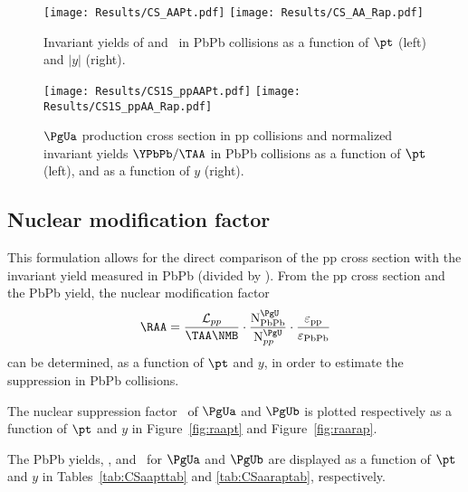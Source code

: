 \begin{figure}[ht]
\begin{centering}  
  \texttt{[image: Results/CS\_AAPt.pdf]}
  \texttt{[image: Results/CS\_AA\_Rap.pdf]}
  \caption{Invariant yields of \PgUa and \PgUb\ in PbPb collisions as
    a function of $\pt$ (left) and $|y|$ (right).}
  \label{fig:CSaapt1vs2} 
\end{centering}  
\end{figure}


\begin{figure}[thp]
\begin{centering}  
  \texttt{[image: Results/CS1S\_ppAAPt.pdf]}
  \texttt{[image: Results/CS1S\_ppAA\_Rap.pdf]}
 \caption{$\PgUa$ production cross section in pp collisions and
   normalized invariant yields $\YPbPb/\TAA$ in PbPb collisions as a
   function of $\pt$ (left), and  as a function of $y$ (right).}
  \label{fig:CSaapt} 
\end{centering}  
\end{figure}




\subsection{Nuclear modification factor \RAA}
\label{subsec:raa}

This formulation allows for the direct comparison of the pp cross section with
the invariant yield measured in PbPb (divided by \TAA). From the pp cross section and the PbPb yield, the nuclear
modification factor
\begin{equation} \label{eq:raa2}
\RAA = \dfrac{\mathcal{L}_{pp}}{\TAA\NMB}\cdot\dfrac{\text{N}^{\PgU}_{\text{PbPb}}}{\text{N}^{\PgU}_{pp}} \cdot \dfrac{\varepsilon_{\rm pp}}{\varepsilon_{\rm PbPb}} 
 \end{equation}  
 can be determined, as a function of $\pt$ and $y$, in order to estimate the suppression in PbPb collisions.
 
The nuclear suppression factor \RAA\ of $\PgUa$ and $\PgUb$ is plotted respectively as a function of $\pt$ and $y$ in Figure~\ref{fig:raapt} and Figure~\ref{fig:raarap}.

The PbPb yields, \YPbPb, and \RAA\ for $\PgUa$ and $\PgUb$ are displayed as a function of $\pt$ and $y$ in Tables~\ref{tab:CSaapttab} and \ref{tab:CSaaraptab}, respectively.


